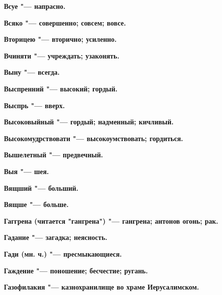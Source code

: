 \bfseries Всуе \normalfont{} "--- напрасно. 




\bfseries Всяко \normalfont{} "--- совершенно; совсем; вовсе. 




\bfseries Вторицею \normalfont{} "--- вторично; усиленно. 




\bfseries Вчиняти \normalfont{} "--- учреждать; узаконять. 




\bfseries Выну \normalfont{} "--- всегда. 




\bfseries Выспренний \normalfont{} "--- высокий; гордый. 




\bfseries Выспрь \normalfont{} "--- вверх. 




\bfseries Высоковыйный \normalfont{} "--- гордый; надменный; кичливый. 




\bfseries Высокомудрствовати \normalfont{} "--- высокоумствовать; гордиться. 




\bfseries Вышелетный \normalfont{} "--- предвечный. 




\bfseries Выя \normalfont{} "--- шея. 




\bfseries Вящший \normalfont{} "--- больший. 




\bfseries Вящше \normalfont{} "--- больше. 




 





\bfseries Гаггрена \normalfont{} (читается "гангрена") "--- гангрена; антонов огонь; рак. 




\bfseries Гадание \normalfont{} "--- загадка; неясность. 




\bfseries Гади \normalfont{} (мн. ч.) "--- пресмыкающиеся. 




\bfseries Гаждение \normalfont{} "--- поношение; бесчестие; ругань. 




\bfseries Газофилакия \normalfont{} "--- казнохранилище во храме Иерусалимском. 





